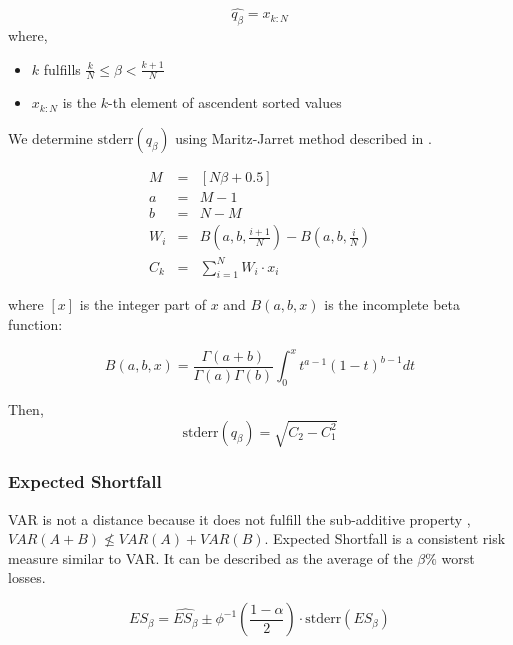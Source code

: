 \documentclass[a4paper,12pt,final]{article}
\begin{document}
\begin{displaymath}
\widehat{q_{\beta}} = x_{k:N}
\end{displaymath}
where,
\begin{itemize}
\item $k$ fulfills $\frac{k}{N} \leq \beta < \frac{k+1}{N}$
\item $x_{k:N}$ is the $k$-th element of ascendent sorted values
\end{itemize}

We determine $\textrm{stderr}(q_{\beta})$ using Maritz-Jarret method described
in \cite{quant:algor}.

\begin{eqnarray}
M   & = & [N \beta + 0.5] \nonumber \\
a   & = & M - 1 \nonumber \\
b   & = & N - M \nonumber \\
W_i & = & B(a,b,\frac{i+1}{N}) - B(a,b,\frac{i}{N}) \nonumber \\
C_k & = & \sum_{i=1}^{N} W_i \cdot x_i \nonumber
\end{eqnarray}

where $[x]$ is the integer part of $x$ and $B(a,b,x)$ is the incomplete beta 
function:

\begin{displaymath}
B(a,b,x)=\frac{\Gamma(a+b)}{\Gamma(a)\Gamma(b)}\int_0^x t^{a-1} (1-t)^{b-1} dt
\end{displaymath}

Then,
\begin{displaymath}
\textrm{stderr}(q_{\beta}) = \sqrt{C_2 - C_1^2}
\end{displaymath}

\subsubsection{Expected Shortfall}
VAR is not a distance because it does not fulfill the sub-additive property 
\cite{var:varbad}, $VAR(A+B) \nleq VAR(A)+VAR(B)$. Expected Shortfall is a 
consistent risk measure \cite{var:eshortfall} similar to VAR. It can be described
as the average of the $\beta\%$ worst losses.

\begin{displaymath}
ES_{\beta} = \widehat{ES_{\beta}} \pm \phi^{-1}\left(\frac{1-\alpha}{2}\right) \cdot \textrm{stderr}(ES_{\beta})
\end{displaymath}
\end{document}
